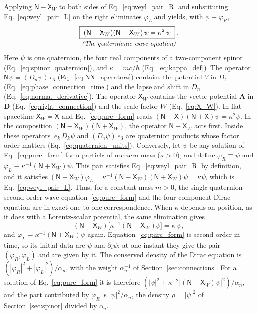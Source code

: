 \documentclass[aps,prd,onecolumn,tightenlines,nofootinbib,notitlepage,11pt,floatfix]{revtex4-2}
\theoremstyle{indentedtheorem}
\begin{document}
Applying $\mathsf{N}-\mathsf{X}_W$ to both sides of Eq.~\eqref{eq:weyl_pair_R} and substituting Eq.~\eqref{eq:weyl_pair_L} on the right eliminates $\varphi_L$ and yields, with $\psi\equiv\varphi_R$,
\begin{equation}
    \begin{gathered}
    \boxed{\; (\mathsf{N}-\mathsf{X}_W)(\mathsf{N}+\mathsf{X}_W) \, \psi = \kappa^2 \, \psi \;} \, . \\[-3pt]
    \text{\small\itshape (The quaternionic wave equation)}
    \end{gathered}
    \label{eq:pure_form}
\end{equation}
Here $\psi$ is one quaternion, the four real components of a two-component spinor (Eq.~\eqref{eq:spinor_quaternion}), and $\kappa=mc/\hbar$ (Eq.~\eqref{eq:kappa_def}). The operator $\mathsf{N}\psi=(D_n\psi)\,e_3$ (Eq.~\eqref{eq:NX_operators}) contains the potential $V$ in $D_t$ (Eq.~\eqref{eq:phase_connection_time}) and the lapse and shift in $D_n$ (Eq.~\eqref{eq:normal_derivative}). The operator $\mathsf{X}_W$ contains the vector potential $\mathbf{A}$ in $\mathbf{D}$ (Eq.~\eqref{eq:right_connection}) and the scale factor $W$ (Eq.~\eqref{eq:X_W}). In flat spacetime $\mathsf{X}_W=\mathsf{X}$ and Eq.~\eqref{eq:pure_form} reads $(\mathsf{N}-\mathsf{X})(\mathsf{N}+\mathsf{X})\psi=\kappa^2\psi$. In the composition $(\mathsf{N}-\mathsf{X}_W)(\mathsf{N}+\mathsf{X}_W)$, the operator $\mathsf{N}+\mathsf{X}_W$ acts first. Inside these operators, $e_k\,D_k\psi$ and $(D_n\psi)\,e_3$ are quaternion products whose factor order matters (Eq.~\eqref{eq:quaternion_units}). Conversely, let $\psi$ be any solution of Eq.~\eqref{eq:pure_form} for a particle of nonzero mass ($\kappa>0$), and define $\varphi_R\equiv\psi$ and $\varphi_L\equiv\kappa^{-1}(\mathsf{N}+\mathsf{X}_W)\psi$. This pair satisfies Eq.~\eqref{eq:weyl_pair_R} by definition, and it satisfies $(\mathsf{N}-\mathsf{X}_W)\varphi_L = \kappa^{-1}(\mathsf{N}-\mathsf{X}_W)(\mathsf{N}+\mathsf{X}_W)\psi = \kappa\psi$, which is Eq.~\eqref{eq:weyl_pair_L}. Thus, for a constant mass $m>0$, the single-quaternion second-order wave equation~\eqref{eq:pure_form} and the four-component Dirac equation are in exact one-to-one correspondence. When $\kappa$ depends on position, as it does with a Lorentz-scalar potential, the same elimination gives
\begin{equation*}
    (\mathsf{N}-\mathsf{X}_W)\big[\kappa^{-1}(\mathsf{N}+\mathsf{X}_W)\psi\big] = \kappa\,\psi ,
\end{equation*}
and $\varphi_L=\kappa^{-1}(\mathsf{N}+\mathsf{X}_W)\psi$ again. Equation~\eqref{eq:pure_form} is second order in time, so its initial data are $\psi$ and $\partial_t\psi$; at one instant they give the pair $(\varphi_R,\varphi_L)$ and are given by it. The conserved density of the Dirac equation is $(|\varphi_R|^2+|\varphi_L|^2)/\alpha_n$, with the weight $\alpha_n^{-1}$ of Section~\ref{sec:connections}. For a solution of Eq.~\eqref{eq:pure_form} it is therefore $(|\psi|^2+\kappa^{-2}|(\mathsf{N}+\mathsf{X}_W)\psi|^2)/\alpha_n$, and the part contributed by $\varphi_R$ is $|\psi|^2/\alpha_n$, the density $\rho=|\psi|^2$ of Section~\ref{sec:spinor} divided by $\alpha_n$.
\end{document}
